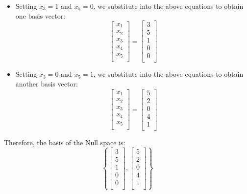 \documentclass[12pt]{article}
\begin{document}
  \begin{itemize}
      \item Setting $x_3 = 1$ and $x_5 = 0$, we substitute into the above equations to obtain one basis vector:
      \[
      \begin{bmatrix}
      x_1 \\
      x_2 \\
      x_3 \\
      x_4 \\
      x_5 \\
      \end{bmatrix}
      =
      \begin{bmatrix}
      3 \\
      5 \\
      1 \\
      0 \\
      0 \\
      \end{bmatrix}
      \]

      \item Setting $x_3 = 0$ and $x_5 = 1$, we substitute into the above equations to obtain another basis vector:
      \[
      \begin{bmatrix}
      x_1 \\
      x_2 \\
      x_3 \\
      x_4 \\
      x_5 \\
      \end{bmatrix}
      =
      \begin{bmatrix}
      5 \\
      2 \\
      0 \\
      4 \\
      1 \\
      \end{bmatrix}
      \]
  \end{itemize}

  Therefore, the basis of the Null space is:
  \[
  \left\{
  \begin{bmatrix}
  3 \\
  5 \\
  1 \\
  0 \\
  0 \\
  \end{bmatrix},
  \begin{bmatrix}
  5 \\
  2 \\
  0 \\
  4 \\
  1 \\
  \end{bmatrix}
  \right\}
  \]
\end{document}
